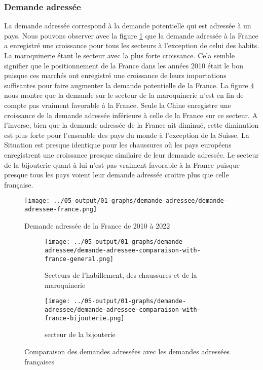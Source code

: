 \documentclass[french,10pt,a4paper]{article}
\begin{document}
\subsubsection{Demande adressée}
La demande adressée correspond à la demande potentielle qui est adressée à un pays. Nous pouvons observer avec la figure \ref{fig:demande-adressee-france} que la demande adressée à la France a enregistré une croissance pour tous les secteurs à l'exception de celui des habits. La maroquinerie étant le secteur avec la plus forte croissance. Cela semble signifier que le positionnement de la France dans les années 2010 était le bon puisque ces marchés ont enregistré une croissance de leurs importations suffisantes pour faire augmenter la demande potentielle de la France. La figure \ref{fig:demande-adressee} nous montre que la demande sur le secteur de la maroquinerie n'est en fin de compte pas vraiment favorable à la France. Seule la Chine enregistre une croissance de la demande adressée inférieure à celle de la France sur ce secteur. A l'inverse, bien que la demande adressée de la France ait diminué, cette diminution est plus forte pour l'ensemble des pays du monde à l'exception de la Suisse. La Situation est presque identique pour les chaussures où les pays européens enregistrent une croissance presque similaire de leur demande adressée. Le secteur de la bijouterie quant à lui n'est pas vraiment favorable à la France puisque presque tous les pays voient leur demande adressée croitre plus que celle française.

\begin{figure}[!h]
  \centering  \texttt{[image: ../05-output/01-graphs/demande-adressee/demande-adressee-france.png]}
  \caption{Demande adressée de la France de 2010 à 2022}
  \label{fig:demande-adressee-france}
\end{figure}

\begin{figure}[!h]
  \centering
  \begin{subfigure}{\textwidth}
    \centering    \texttt{[image: ../05-output/01-graphs/demande-adressee/demande-adressee-comparaison-with-france-general.png]}
    \caption{Secteurs de l'habillement, des chaussures et de la maroquinerie}
    \label{fig:demande-adressee-comparaison-with-france-general}
  \end{subfigure}
  \vspace{0.5cm}
  \begin{subfigure}{\textwidth}
    \centering \texttt{[image: ../05-output/01-graphs/demande-adressee/demande-adressee-comparaison-with-france-bijouterie.png]}
 \caption{secteur de la bijouterie}
 \label{fig:demande-adressee-comparaison-with-france-bijouterie}
  \end{subfigure}
  \caption{Comparaison des demandes adressées avec les demandes adressées françaises}
  \label{fig:demande-adressee}
\end{figure}
\end{document}
